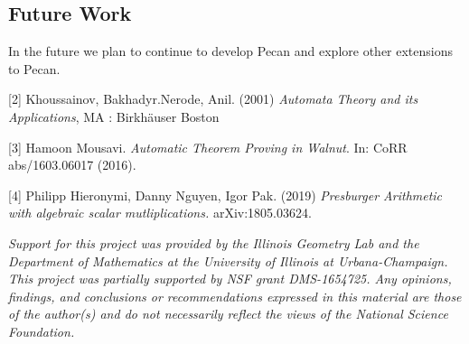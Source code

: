 \documentclass[landscape,usenames,dvipsnames]{sciposter}
\begin{document}
\begin{multicols}{3}
\section*{Future Work}
In the future we plan to continue to develop Pecan and explore other extensions to Pecan.






{
\footnotesize



[2] Khoussainov, Bakhadyr.Nerode, Anil. (2001) \emph{Automata Theory and its Applications}, MA : Birkh\"auser Boston

[3] Hamoon Mousavi. \emph{Automatic Theorem Proving in Walnut}. In: CoRR abs/1603.06017 (2016).

[4] Philipp Hieronymi, Danny Nguyen, Igor Pak. (2019) \emph{Presburger Arithmetic with algebraic scalar mutliplications.} arXiv:1805.03624.
}

\vspace*{10mm} %
\emph{Support for this project was provided by the Illinois Geometry Lab and the Department of Mathematics at the University of Illinois at Urbana-Champaign. This project was partially supported by NSF grant DMS-1654725. Any opinions, findings, and conclusions or recommendations expressed in this material are those of the author(s) and do not necessarily reflect the views of the National Science Foundation.}
\end{multicols}
\end{document}
